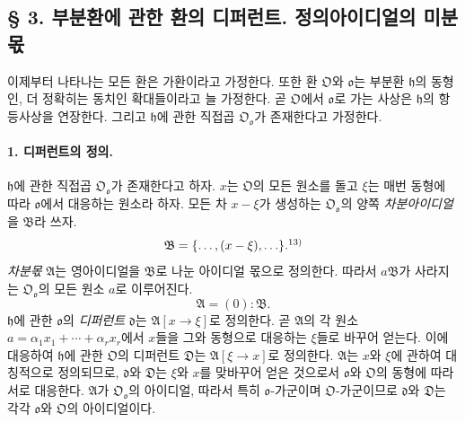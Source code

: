 \subsection*{§ 3. 부분환에 관한 환의 디퍼런트. 정의아이디얼의 미분몫}

이제부터 나타나는 모든 환은 가환이라고 가정한다. 또한 환 \(\mathfrak O\)와 \(\mathfrak o\)는 부분환 \(\mathfrak h\)의 동형인, 더 정확히는 동치인 확대들이라고 늘 가정한다. 곧 \(\mathfrak O\)에서 \(\mathfrak o\)로 가는 사상은 \(\mathfrak h\)의 항등사상을 연장한다. 그리고 \(\mathfrak h\)에 관한 직접곱 \(\mathfrak O_{\mathfrak o}\)가 존재한다고 가정한다.

\paragraph{1. 디퍼런트의 정의.}
\(\mathfrak h\)에 관한 직접곱 \(\mathfrak O_{\mathfrak o}\)가 존재한다고 하자. \(x\)는 \(\mathfrak O\)의 모든 원소를 돌고 \(\xi\)는 매번 동형에 따라 \(\mathfrak o\)에서 대응하는 원소라 하자. 모든 차 \(x-\xi\)가 생성하는 \(\mathfrak O_{\mathfrak o}\)의 양쪽 \emph{차분아이디얼}을 \(\mathfrak B\)라 쓰자.
\[
\mathfrak B=\{\ldots,(x-\xi),\ldots\}.\srcfnmark{13)}
\]
\emph{차분몫} \(\mathfrak A\)는 영아이디얼을 \(\mathfrak B\)로 나눈 아이디얼 몫으로 정의한다. 따라서 \(a\mathfrak B\)가 사라지는 \(\mathfrak O_{\mathfrak o}\)의 모든 원소 \(a\)로 이루어진다.
\[
\mathfrak A=(0):\mathfrak B.
\]
\(\mathfrak h\)에 관한 \(\mathfrak o\)의 \emph{디퍼런트} \(\mathfrak d\)는 \(\mathfrak A[x\to\xi]\)로 정의한다. 곧 \(\mathfrak A\)의 각 원소 \(a=\alpha_1x_1+\cdots+\alpha_rx_r\)에서 \(x\)들을 그와 동형으로 대응하는 \(\xi\)들로 바꾸어 얻는다. 이에 대응하여 \(\mathfrak h\)에 관한 \(\mathfrak O\)의 디퍼런트 \(\mathfrak D\)는 \(\mathfrak A[\xi\to x]\)로 정의한다. \(\mathfrak A\)는 \(x\)와 \(\xi\)에 관하여 대칭적으로 정의되므로, \(\mathfrak d\)와 \(\mathfrak D\)는 \(\xi\)와 \(x\)를 맞바꾸어 얻은 것으로서 \(\mathfrak o\)와 \(\mathfrak O\)의 동형에 따라 서로 대응한다. \(\mathfrak A\)가 \(\mathfrak O_{\mathfrak o}\)의 아이디얼, 따라서 특히 \(\mathfrak o\)-가군이며 \(\mathfrak O\)-가군이므로 \(\mathfrak d\)와 \(\mathfrak D\)는 각각 \(\mathfrak o\)와 \(\mathfrak O\)의 아이디얼이다.


